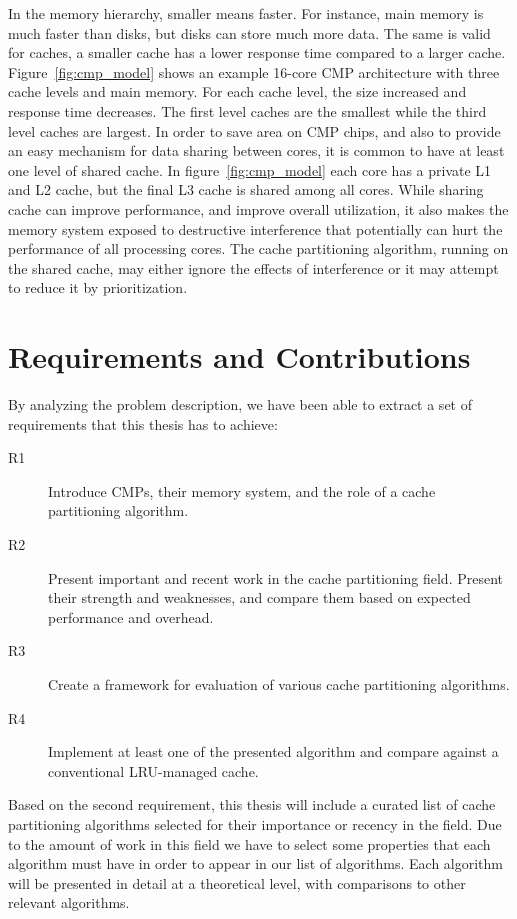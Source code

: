 In the memory hierarchy, smaller means faster. 
For instance, main memory is much faster than disks, but disks can store much more data.
The same is valid for caches, a smaller cache has a lower response time compared to a larger cache.
Figure~\ref{fig:cmp_model} shows an example 16-core CMP architecture with three cache levels and main memory.
For each cache level, the size increased and response time decreases.
The first level caches are the smallest while the third level caches are largest.
In order to save area on CMP chips, and also to provide an easy mechanism for data sharing between cores, it is common to have at least one level of shared cache.
In figure~\ref{fig:cmp_model} each core has a private L1 and L2 cache, but the final L3 cache is shared among all cores.
While sharing cache can improve performance, and improve overall utilization, it also makes the memory system exposed to destructive interference that potentially can hurt the performance of all processing cores. 
The cache partitioning algorithm, running on the shared cache, may either ignore the effects of interference or it may attempt to reduce it by prioritization.


\section{Requirements and Contributions}
By analyzing the problem description, we have been able to extract a set of requirements that this thesis has to achieve:

\begin{description}
    \item[R1] Introduce CMPs, their memory system, and the role of a cache partitioning algorithm.
    \item[R2] Present important and recent work in the cache partitioning field. Present their strength and weaknesses, and compare them based on expected performance and overhead.
    \item[R3] Create a framework for evaluation of various cache partitioning algorithms.
    \item[R4] Implement at least one of the presented algorithm and compare against a conventional LRU-managed cache.
\end{description}

Based on the second requirement, this thesis will include a curated list of cache partitioning algorithms selected for their importance or recency in the field.
Due to the amount of work in this field we have to select some properties that each algorithm must have in order to appear in our list of algorithms.
Each algorithm will be presented in detail at a theoretical level, with comparisons to other relevant algorithms.

